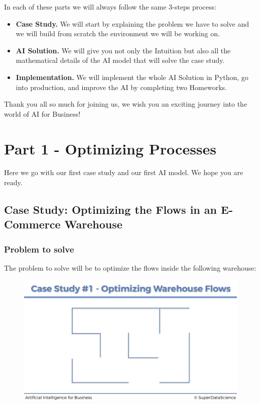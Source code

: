 \documentclass[]{book}
\providecommand{\tightlist}{%
  \setlength{\itemsep}{0pt}\setlength{\parskip}{0pt}}
\begin{document}
In each of these parts we will always follow the same 3-steps process:

\begin{itemize}
\tightlist
\item
  \textbf{Case Study.} We will start by explaining the problem we have to solve and we will build from scratch the environment we will be working on.
\item
  \textbf{AI Solution.} We will give you not only the Intuition but also all the mathematical details of the AI model that will solve the case study.
\item
  \textbf{Implementation.} We will implement the whole AI Solution in Python, go into production, and improve the AI by completing two Homeworks.
\end{itemize}

Thank you all so much for joining us, we wish you an exciting journey into the world of AI for Business!

\hypertarget{part-1---optimizing-processes}{%
\chapter{Part 1 - Optimizing Processes}\label{part-1---optimizing-processes}}

Here we go with our first case study and our first AI model. We hope you are ready.

\hypertarget{case-study-optimizing-the-flows-in-an-e-commerce-warehouse}{%
\section{Case Study: Optimizing the Flows in an E-Commerce Warehouse}\label{case-study-optimizing-the-flows-in-an-e-commerce-warehouse}}

\hypertarget{problem-to-solve}{%
\subsection{Problem to solve}\label{problem-to-solve}}

The problem to solve will be to optimize the flows inside the following warehouse:

\begin{figure}[!htbp]
        \begin{center}
            \includegraphics[scale=0.15]{Warehouse_1.png}
        \end{center}
\end{figure}
\end{document}
